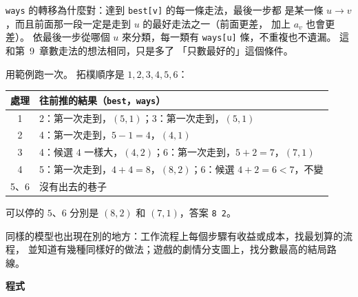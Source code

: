 \texttt{ways} 的轉移為什麼對：達到 \texttt{best[v]} 的每一條走法，最後一步都
是某一條 $u \to v$，而且前面那一段一定是走到 $u$ 的最好走法之一（前面更差，
加上 $a_v$ 也會更差）。 依最後一步從哪個 $u$ 來分類，每一類有
\texttt{ways[u]} 條，不重複也不遺漏。 這和第~9~章數走法的想法相同，只是多了
「只數最好的」這個條件。

用範例跑一次。 拓樸順序是 $1, 2, 3, 4, 5, 6$：

\begin{center}
\begin{tabular}{cl}
\toprule
處理 & 往前推的結果（\texttt{best}，\texttt{ways}） \\
\midrule
1 & 2：第一次走到，$(5, 1)$；3：第一次走到，$(5, 1)$ \\
2 & 4：第一次走到，$5 - 1 = 4$，$(4, 1)$ \\
3 & 4：候選 $4$ 一樣大，$(4, 2)$；6：第一次走到，$5 + 2 = 7$，$(7, 1)$ \\
4 & 5：第一次走到，$4 + 4 = 8$，$(8, 2)$；6：候選 $4 + 2 = 6 < 7$，不變 \\
5、6 & 沒有出去的巷子 \\
\bottomrule
\end{tabular}
\end{center}

可以停的 $5$、$6$ 分別是 $(8, 2)$ 和 $(7, 1)$，答案 \texttt{8 2}。

同樣的模型也出現在別的地方：工作流程上每個步驟有收益或成本，找最划算的流程，
並知道有幾種同樣好的做法；遊戲的劇情分支圖上，找分數最高的結局路線。

\textbf{程式}


